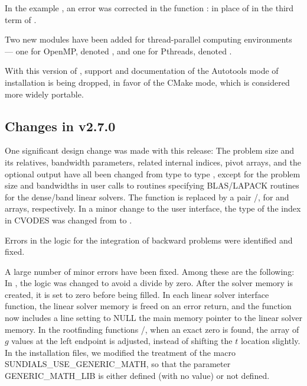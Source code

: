 In the example , an error was corrected in the
function :  in place of  in the third term of
.

Two new {\nvector} modules have been added for thread-parallel computing
environments --- one for OpenMP, denoted ,
and one for Pthreads, denoted .

With this version of {\sundials}, support and documentation of the
Autotools mode of installation is being dropped, in favor of the
CMake mode, which is considered more widely portable.

\subsection*{Changes in v2.7.0}

One significant design change was made with this release: The problem
size and its relatives, bandwidth parameters, related internal indices,
pivot arrays, and the optional output  have all been
changed from type  to type , except for the
problem size and bandwidths in user calls to routines specifying
BLAS/LAPACK routines for the dense/band linear solvers.  The function
 is replaced by a pair /,
for  and  arrays, respectively.  In a minor
change to the user interface, the type of the index  in
CVODES was changed from  to .

Errors in the logic for the integration of backward problems were
identified and fixed.

A large number of minor errors have been fixed.  Among these are the following:
In , the logic was changed to avoid a divide by zero.
After the solver memory is created, it is set to zero before being filled.
In each linear solver interface function, the linear solver memory is
freed on an error return, and the  function now includes a
line setting to NULL the main memory pointer to the linear solver memory.
In the rootfinding functions /, when an exact
zero is found, the array  of $g$ values at the left endpoint is
adjusted, instead of shifting the $t$ location  slightly.
In the installation files, we modified the treatment of the macro
SUNDIALS\_USE\_GENERIC\_MATH, so that the parameter GENERIC\_MATH\_LIB is
either defined (with no value) or not defined.

